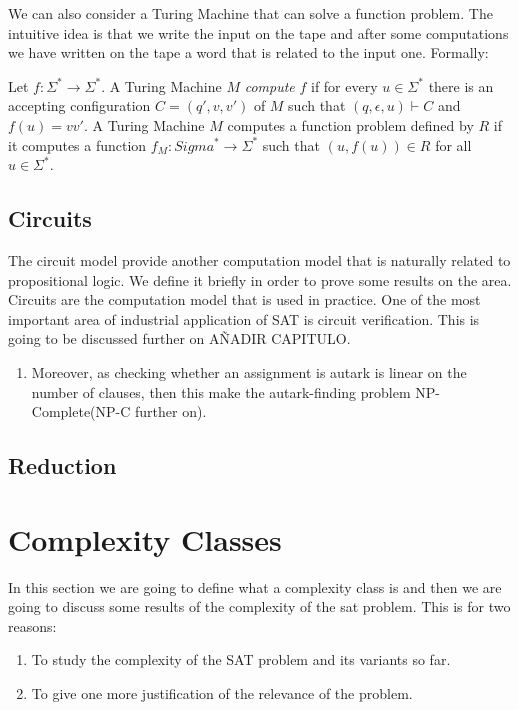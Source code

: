   We can also consider a Turing Machine that can solve a function problem. The intuitive idea is that we write the input on the tape and after some computations we have written on the tape a word that is related to the input one. Formally:


  \begin{definition}
    Let $f:\Sigma^*\to \Sigma^*$. A Turing Machine $M$ \emph{compute} $f$ if for every $u\in \Sigma^*$ there is an accepting configuration $C=(q',v,v')$ of $M$  such that $(q,\epsilon,u)\vdash C$ and $f(u)=vv'$. A Turing Machine $M$ computes a function problem defined by $R$ if it computes a function $f_M:Sigma^*\to \Sigma^*$ such that $(u,f(u)) \in R$ for all $ u\in \Sigma^*$.
  \end{definition}

  
\subsection{Circuits}

The circuit model provide another computation model that is naturally related to propositional logic. We define it briefly in order to prove some results on the area. Circuits are the computation model that is used in practice. One of the most important area of industrial application of SAT is circuit verification. This is going to be discussed further on AÑADIR CAPITULO.

\begin{enumerate}
\item Moreover, as checking whether an assignment is autark is linear on the number of clauses, then this make the autark-finding problem NP-Complete(NP-C further on).
\end{enumerate}

\subsection{Reduction}

\section{Complexity Classes}
In this section we are going to define what a complexity class is and then we are going to discuss some results of the complexity of the sat problem. This is for two reasons: 

\begin{enumerate}
\item To study the complexity of the SAT problem and its variants so far.

\item To give one more justification of the relevance of the problem.
\end{enumerate}

